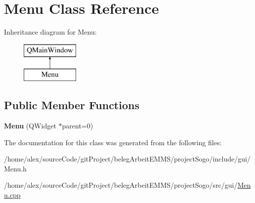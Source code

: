 \hypertarget{classMenu}{\section{Menu Class Reference}
\label{classMenu}
}
Inheritance diagram for Menu\-:\begin{figure}[H]
\begin{center}
\leavevmode
\includegraphics[height=2.000000cm]{classMenu}
\end{center}
\end{figure}
\subsection*{Public Member Functions}
\begin{DoxyCompactItemize}
\item 
\hypertarget{classMenu_aea36ff15ed756c91b7731a2025175f16}{{\bfseries Menu} (Q\-Widget $\ast$parent=0)}\label{classMenu_aea36ff15ed756c91b7731a2025175f16}

\end{DoxyCompactItemize}


The documentation for this class was generated from the following files\-:\begin{DoxyCompactItemize}
\item 
/home/alex/source\-Code/git\-Project/beleg\-Arbeit\-E\-M\-M\-S/project\-Sogo/include/gui/Menu.\-h\item 
/home/alex/source\-Code/git\-Project/beleg\-Arbeit\-E\-M\-M\-S/project\-Sogo/src/gui/\hyperlink{Menu_8cpp}{Menu.\-cpp}\end{DoxyCompactItemize}

